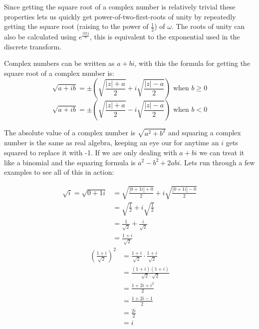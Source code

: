 \documentclass[12pt]{article}
\begin{document}
Since getting the square root of a complex number is relatively trivial these properties lets us quickly get power-of-two-first-roots of unity by repeatedly getting the square root (raising to the power of $\frac{1}{2}$) of $\omega$. The roots of unity can also be calculated using $e^\frac{i2\pi j}{n}$, this is equivalent to the exponential used in the discrete transform.

\pagebreak

Complex numbers can be written as $a + bi$, with this the formula for getting the square root of a complex number is:
\begin{displaymath}
  \sqrt{a+ib} = \pm\left(\sqrt{\frac{|z| + a}{2}} + i\sqrt{\frac{|z| - a}{2}}\right) \text{ when } b \ge 0
\end{displaymath}
\begin{displaymath}
  \sqrt{a+ib} = \pm\left(\sqrt{\frac{|z| + a}{2}} - i\sqrt{\frac{|z| - a}{2}}\right) \text{ when } b < 0
\end{displaymath}

The absolute value of a complex number is $\sqrt{a^2+b^2}$ and squaring a complex number is the same as real algebra, keeping an eye our for anytime an $i$ gets squared to replace it with -1. If we are only dealing with $a + bi$ we can treat it like a binomial and the squaring formula is $a^2 - b^2 + 2abi$. Lets run through a few examples to see all of this in action:
\begin{multicols}{2}
  \null \vfill
  \begin{align*}
    \sqrt{i} = \sqrt{0+1i} & = \sqrt{\frac{|0+1i| + 0}{2}} + i\sqrt{\frac{|0+1i| - 0}{2}} \\
                           & = \sqrt{\frac{1}{2}} + i\sqrt{\frac{1}{2}}                   \\
                           & = \frac{1}{\sqrt{2}} + \frac{i}{\sqrt{2}}                    \\
                           & = \frac{1+i}{\sqrt{2}}
  \end{align*}
  \vfill \null
  \columnbreak
  \null \vfill
  \begin{align*}
    \left(\frac{1+i}{\sqrt{2}}\right)^2 & = \frac{1+i}{\sqrt{2}} \cdot \frac{1+i}{\sqrt{2}} \\
                                        & = \frac{(1+i)(1+i)}{\sqrt{2}\cdot\sqrt{2}}        \\
                                        & = \frac{1+2i+i^2}{2}                              \\
                                        & = \frac{1+2i-1}{2}                                \\
                                        & = \frac{2i}{2}                                    \\
                                        & = i
  \end{align*}
  \vfill \null
\end{multicols}
\end{document}
